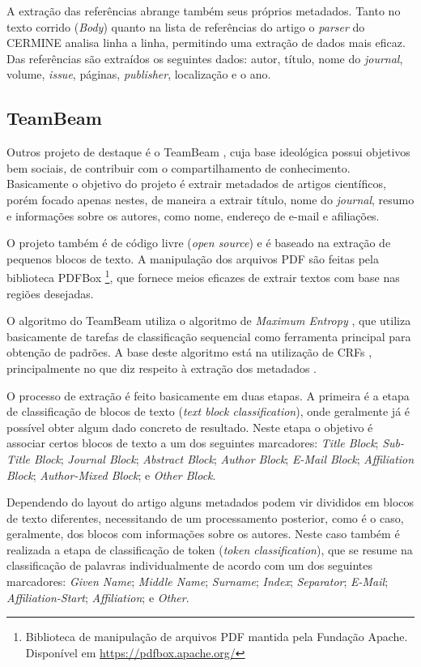 A extração das referências abrange também seus próprios metadados. Tanto no texto corrido (\textit{Body}) quanto na lista de referências do artigo o \textit{parser} do CERMINE analisa linha a linha, permitindo uma extração de dados mais eficaz. Das referências são extraídos os seguintes dados: autor, título, nome do \textit{journal}, volume, \textit{issue}, páginas, \textit{publisher}, localização e o ano.

\subsection{TeamBeam}
\label{ssec:teambeam}

Outros projeto de destaque é o TeamBeam \cite{teambeam}, cuja base ideológica possui objetivos bem sociais, de contribuir com o compartilhamento de conhecimento. Basicamente o objetivo do projeto é extrair metadados de artigos científicos, porém focado apenas nestes, de maneira a extrair título, nome do \textit{journal}, resumo e informações sobre os autores, como nome, endereço de e-mail e afiliações.

O projeto também é de código livre (\textit{open source}) e é baseado na extração de pequenos blocos de texto. A manipulação dos arquivos PDF são feitas pela biblioteca PDFBox \footnote{Biblioteca de manipulação de arquivos PDF mantida pela Fundação Apache. Disponível em \url{https://pdfbox.apache.org/}}, que fornece meios eficazes de extrair textos com base nas regiões desejadas.

O algoritmo do TeamBeam utiliza o algoritmo de \textit{Maximum Entropy} \cite{maximum-entropy}, que utiliza basicamente de tarefas de classificação sequencial como ferramenta principal para obtenção de padrões. A base deste algoritmo está na utilização de CRFs \cite{Lafferty-CRF}, principalmente no que diz respeito à extração dos metadados \cite{Peng-CRF-IE}.

O processo de extração é feito basicamente em duas etapas. A primeira é a etapa de classificação de blocos de texto (\textit{text block classification}), onde geralmente já é possível obter algum dado concreto de resultado. Neste etapa o objetivo é associar certos blocos de texto a um dos seguintes marcadores: \textit{Title Block}; \textit{Sub-Title Block}; \textit{Journal Block}; \textit{Abstract Block}; \textit{Author Block}; \textit{E-Mail Block}; \textit{Affiliation Block}; \textit{Author-Mixed Block}; e \textit{Other Block}.

Dependendo do layout do artigo alguns metadados podem vir divididos em blocos de texto diferentes, necessitando de um processamento posterior, como é o caso, geralmente, dos blocos com informações sobre os autores. Neste caso também é realizada a etapa de classificação de token (\textit{token classification}), que se resume na classificação de palavras individualmente de acordo com um dos seguintes marcadores: \textit{Given Name}; \textit{Middle Name}; \textit{Surname}; \textit{Index}; \textit{Separator}; \textit{E-Mail}; \textit{Affiliation-Start}; \textit{Affiliation}; e \textit{Other}.

